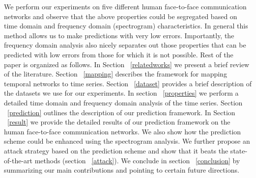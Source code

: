 We perform our experiments on five different human face-to-face communication networks 
and observe that the above properties could be segregated based on time domain and frequency domain (spectrogram) characteristics. 
In general this method allows us to make predictions with very low errors.   
 Importantly, the frequency domain analysis also nicely separates out those properties that can be predicted with low errors from those for which it is not 
 possible.
Rest of the paper is organized as follows. In Section ~\ref{relatedworks} we present a brief review of the literature. 
Section ~\ref{mapping} describes the framework for mapping temporal networks to time series. 
Section ~\ref{dataset} provides a brief description of the datasets we use for 
our experiments.
  In section ~\ref{properties} we perform a detailed time domain and frequency domain analysis of the time series. 
Section ~\ref{prediction} outlines the description of our prediction framework. In Section ~\ref{result} we provide the detailed results of our prediction framework on the 
human face-to-face communication networks. We also show how the prediction scheme could be enhanced using the spectrogram analysis. We further 
propose an attack strategy based on the prediction scheme and show that it beats the state-of-the-art methods (section ~\ref{attack}). 
We conclude in section ~\ref{conclusion} by summarizing our main contributions and pointing to certain future directions.
\fi
\medskip

